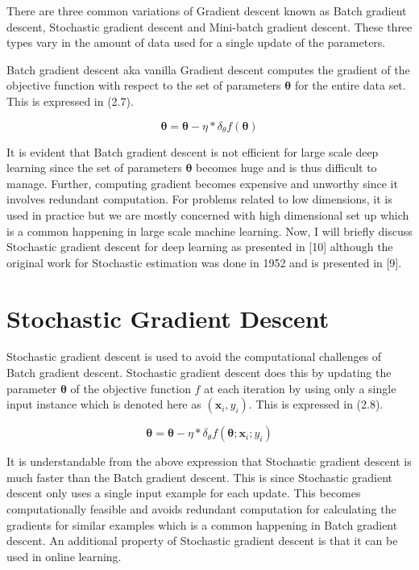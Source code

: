 There are three common variations of Gradient descent known as Batch gradient descent, Stochastic gradient descent and Mini-batch gradient descent. These three types vary in the amount of data used for a single update of the parameters. 

Batch gradient descent aka vanilla Gradient descent computes the gradient of the objective function with respect to the set of parameters $\bm{\theta}$ for the entire data set. This is expressed in (2.7). 

\begin{equation}
\bm{\theta} = \bm{\theta} - \eta * \delta_\theta f(\bm{\theta})
\end{equation}   

It is evident that Batch gradient descent is not efficient for large scale deep learning since the set of parameters $\bm{\theta}$ becomes huge and is thus difficult to manage. Further, computing gradient becomes expensive and unworthy since it involves redundant computation. For problems related to low dimensions, it is used in practice but we are mostly concerned with high dimensional set up which is a common happening in large scale machine learning. Now, I will briefly discuss Stochastic gradient descent for deep learning as presented in [10] although the original work for Stochastic estimation was done in 1952 and is presented in [9].

\section {Stochastic Gradient Descent}

Stochastic gradient descent is used to avoid the computational challenges of Batch gradient descent. Stochastic gradient descent does this by updating the parameter $\bm{\theta}$ of the objective function $f$ at each iteration by using only a single input instance which is denoted here as $(\textbf{x}_i,y_i)$. This is expressed in (2.8).

\begin{equation}
\bm{\theta} = \bm{\theta} - \eta * \delta_\theta f(\bm{\theta};\textbf{x}_i;y_i)
\end{equation}   
 
It is understandable from the above expression that Stochastic gradient descent is much faster than the Batch gradient descent. This is since Stochastic gradient descent only uses a single input example for each update. This becomes computationally feasible and avoids redundant computation for calculating the gradients for similar examples which is a common happening in Batch gradient descent. An additional property of Stochastic gradient descent is that it can be used in online learning. 


